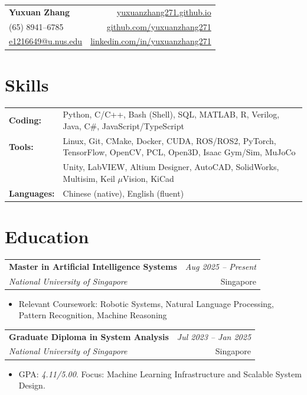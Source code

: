 \documentclass[11pt]{article}
\makeatletter
\newcommand{\name}[1]{\textbf{\LARGE #1}}
\newcommand{\contact}[1]{\small #1}
\newenvironment{cvitems}{%
  \setlength{\parskip}{0pt}%
\begin{itemize}[leftmargin=*, itemsep=0.1em, topsep=0em, partopsep=0em, parsep=0pt]}{
  \end{itemize}}
\newcommand{\cventry}[4]{%
  \noindent
  \begin{tabular*}{\textwidth}{@{}p{0.75\textwidth}@{\extracolsep{\fill}}r@{}}
    \textbf{#1} & \textit{#4} \\
    \textit{#2} & #3 \\
  \end{tabular*}
  \vspace{-0.4em}
}
\makeatother
\begin{document}
\begin{tabularx}{\linewidth}{@{}X r@{}}
  \name{Yuxuan Zhang} & \contact{\href{https://yuxuanzhang271.github.io}{yuxuanzhang271.github.io}}\\
  \contact{(65) 8941--6785} & \contact{\href{https://github.com/yuxuanzhang271}{github.com/yuxuanzhang271}}\\
  \contact{\href{mailto:e1216649@u.nus.edu}{e1216649@u.nus.edu}} & \contact{\href{https://www.linkedin.com/in/yuxuanzhang271}{linkedin.com/in/yuxuanzhang271}}\\
\end{tabularx}

\section{Skills}
\begin{tabularx}{\linewidth}{@{}l X@{}}
  \textbf{Coding:} & Python, C/C++, Bash (Shell), SQL, MATLAB, R, Verilog, Java, C\#, JavaScript/TypeScript \\
  \textbf{Tools:} & Linux, Git, CMake, Docker, CUDA, ROS/ROS2, PyTorch, TensorFlow, OpenCV, PCL, Open3D, Isaac Gym/Sim, MuJoCo \\
  & Unity, LabVIEW, Altium Designer, AutoCAD, SolidWorks, Multisim, Keil $\mu$Vision, KiCad \\
  \textbf{Languages:} & Chinese (native), English (fluent) \\
\end{tabularx}

\section{Education}
\cventry{Master in Artificial Intelligence Systems}{National University of Singapore}{Singapore}{Aug 2025 -- Present}
\begin{cvitems}
\item Relevant Coursework: Robotic Systems, Natural Language Processing, Pattern Recognition, Machine Reasoning
\end{cvitems}

\cventry{Graduate Diploma in System Analysis}{National University of Singapore}{Singapore}{Jul 2023 -- Jan 2025}
\begin{cvitems}
\item GPA: \textit{4.11/5.00}. Focus: Machine Learning Infrastructure and Scalable System Design.
\end{cvitems}
\end{document}
